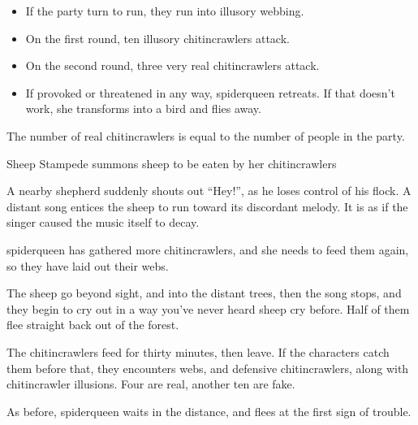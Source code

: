\begin{multicols}{2}
\begin{itemize}
	\item{If the party turn to run, they run into illusory webbing.}

	\item{On the first round, ten illusory chitincrawlers attack.}

	\item{On the second round, three very real chitincrawlers attack.}

	\item{If provoked or threatened in any way, \gls{spiderqueen} retreats.  If that doesn't work, she transforms into a bird and flies away.}

\end{itemize}

The number of real chitincrawlers is equal to the number of people in the party.


{Sheep Stampede}%
{ summons sheep to be eaten by her chitincrawlers}%

\begin{boxtext}

	A nearby shepherd suddenly shouts out ``Hey!'', as he loses control of his flock.
	A distant song entices the sheep to run toward its discordant melody. It is as if the singer caused the music itself to decay.

\end{boxtext}

\noindent
\Gls{spiderqueen} has gathered more chitincrawlers, and she needs to feed them again, so they have laid out their webs.

\begin{boxtext}

	The sheep go beyond sight, and into the distant trees, then the song stops, and they begin to cry out in a way you've never heard sheep cry before.  Half of them flee straight back out of the forest.

\end{boxtext}

The chitincrawlers feed for thirty minutes, then leave.  If the characters catch them before that, they encounters webs, and defensive chitincrawlers, along with chitincrawler illusions.  Four are real, another ten are fake.

As before, \gls{spiderqueen} waits in the distance, and flees at the first sign of trouble.



\end{multicols}
